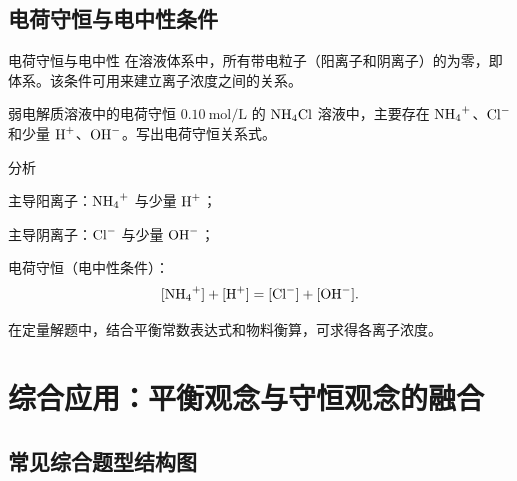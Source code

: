 \documentclass[a4paper,11pt]{ctexart}
\begin{document}
\subsection{电荷守恒与电中性条件}

\begin{definitionbox}{电荷守恒与电中性}
  在溶液体系中，所有带电粒子（阳离子和阴离子）的为零，即体系。该条件可用来建立离子浓度之间的关系。
\end{definitionbox}

\begin{examplebox}{弱电解质溶液中的电荷守恒}
  $0.10\ \mathrm{mol/L}$ 的 $\ce{NH4Cl}$ 溶液中，主要存在 $\ce{NH4^+}$、$\ce{Cl^-}$ 和少量 $\ce{H^+}$、$\ce{OH^-}$。写出电荷守恒关系式。

  \begin{proofbox}{分析}
    \begin{focuspoints}
      \item 主导阳离子：$\ce{NH4^+}$ 与少量 $\ce{H^+}$；
      \item 主导阴离子：$\ce{Cl^-}$ 与少量 $\ce{OH^-}$；
      \item 电荷守恒（电中性条件）：
      \[
        [\ce{NH4^+}] + [\ce{H^+}] = [\ce{Cl^-}] + [\ce{OH^-}].
      \]
      \item 在定量解题中，结合平衡常数表达式和物料衡算，可求得各离子浓度。
    \end{focuspoints}
  \end{proofbox}
\end{examplebox}

\clearpage

\section{综合应用：平衡观念与守恒观念的融合}
\label{sec:combined}

\subsection{常见综合题型结构图}
\end{document}
